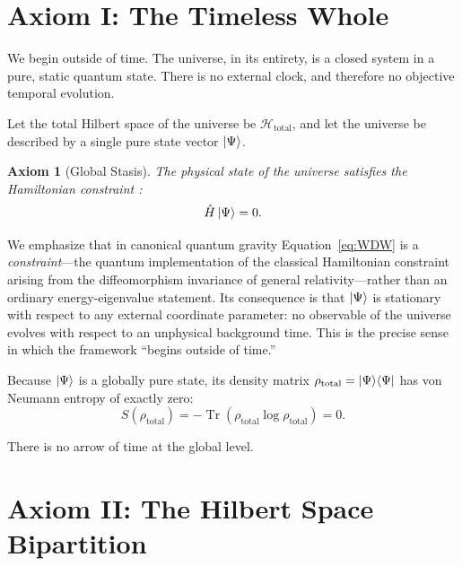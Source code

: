 \documentclass[11pt, a4paper]{article}
\newtheorem{axiom}{Axiom}
\begin{document}
\section{Axiom I: The Timeless Whole}
\label{sec:axiom1}

We begin outside of time. The universe, in its entirety, is a closed system in a pure, static quantum state. There is no external clock, and therefore no objective temporal evolution.

Let the total Hilbert space of the universe be $\mathcal{H}_{\mathrm{total}}$, and let the universe be described by a single pure state vector $\ket{\Psi}$.

\begin{axiom}[Global Stasis]
The physical state of the universe satisfies the Hamiltonian constraint \cite{DeWitt1967}:
\begin{equation}
\hat{H}\ket{\Psi} = 0.
\label{eq:WDW}
\end{equation}
\end{axiom}

We emphasize that in canonical quantum gravity Equation~\eqref{eq:WDW} is a \emph{constraint}---the quantum implementation of the classical Hamiltonian constraint arising from the diffeomorphism invariance of general relativity---rather than an ordinary energy-eigenvalue statement. Its consequence is that $\ket{\Psi}$ is stationary with respect to any external coordinate parameter: no observable of the universe evolves with respect to an unphysical background time. This is the precise sense in which the framework ``begins outside of time.''

Because $\ket{\Psi}$ is a globally pure state, its density matrix $\rho_{\mathrm{total}} = \ket{\Psi}\!\bra{\Psi}$ has von Neumann entropy of exactly zero:
\begin{equation}
S(\rho_{\mathrm{total}}) = -\operatorname{Tr}(\rho_{\mathrm{total}} \log \rho_{\mathrm{total}}) = 0.
\label{eq:Stotal}
\end{equation}

There is no arrow of time at the global level.

\section{Axiom II: The Hilbert Space Bipartition}
\label{sec:axiom2}
\end{document}
